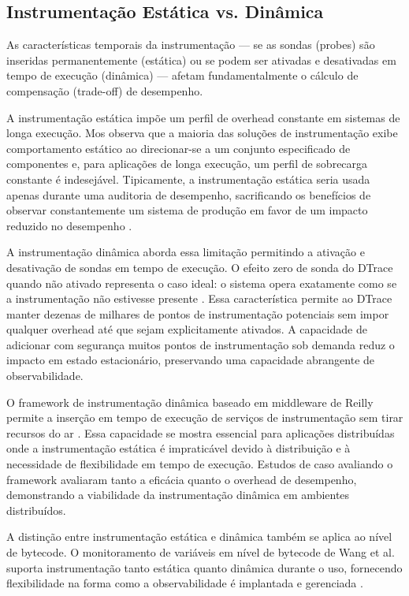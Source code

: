 \documentclass[sigconf, anonymous]{acmart}
\begin{document}
\subsection{Instrumentação Estática vs. Dinâmica}

As características temporais da instrumentação — se as sondas (probes) são inseridas permanentemente (estática) ou se podem ser ativadas e desativadas em tempo de execução (dinâmica) — afetam fundamentalmente o cálculo de compensação (trade-off) de desempenho.

A instrumentação estática impõe um perfil de overhead constante em sistemas de longa execução. Mos observa que a maioria das soluções de instrumentação exibe comportamento estático ao direcionar-se a um conjunto especificado de componentes e, para aplicações de longa execução, um perfil de sobrecarga constante é indesejável. Tipicamente, a instrumentação estática seria usada apenas durante uma auditoria de desempenho, sacrificando os benefícios de observar constantemente um sistema de produção em favor de um impacto reduzido no desempenho \cite{mos_2004}.

A instrumentação dinâmica aborda essa limitação permitindo a ativação e desativação de sondas em tempo de execução. O efeito zero de sonda do DTrace quando não ativado representa o caso ideal: o sistema opera exatamente como se a instrumentação não estivesse presente \cite{cantrill_2004}. Essa característica permite ao DTrace manter dezenas de milhares de pontos de instrumentação potenciais sem impor qualquer overhead até que sejam explicitamente ativados. A capacidade de adicionar com segurança muitos pontos de instrumentação sob demanda reduz o impacto em estado estacionário, preservando uma capacidade abrangente de observabilidade.

O framework de instrumentação dinâmica baseado em middleware de Reilly permite a inserção em tempo de execução de serviços de instrumentação sem tirar recursos do ar \cite{reilly_2006}. Essa capacidade se mostra essencial para aplicações distribuídas onde a instrumentação estática é impraticável devido à distribuição e à necessidade de flexibilidade em tempo de execução. Estudos de caso avaliando o framework avaliaram tanto a eficácia quanto o overhead de desempenho, demonstrando a viabilidade da instrumentação dinâmica em ambientes distribuídos.

A distinção entre instrumentação estática e dinâmica também se aplica ao nível de bytecode. O monitoramento de variáveis em nível de bytecode de Wang et al. suporta instrumentação tanto estática quanto dinâmica durante o uso, fornecendo flexibilidade na forma como a observabilidade é implantada e gerenciada \cite{wang_2025}.
\end{document}
